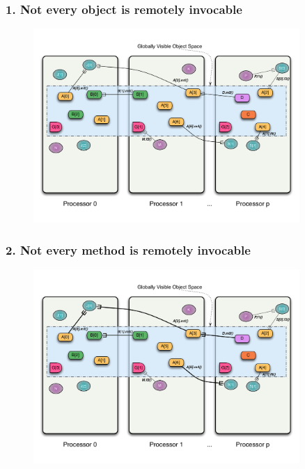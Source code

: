 \begin{frame}
\frametitle{1. Not every object is remotely invocable}
  \begin{figure}\includegraphics[width=0.9\textwidth]{../figures/progmodel/10-rmi-notgas.pdf}\end{figure}
\end{frame}


\begin{frame}
\frametitle{2. Not every method is remotely invocable}
  \begin{figure}\includegraphics[width=0.9\textwidth]{../figures/progmodel/11-global-methods.pdf}\end{figure}
\end{frame}


